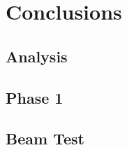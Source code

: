 \chapter{Conclusions}\label{ch:Conclusions}

\section{Analysis}
\section{Phase 1}
\section{Beam Test}